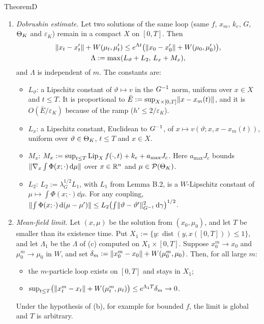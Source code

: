 \begin{thm}{Theorem}{D}
\begin{enumerate}[label=\textup{(\alph*)}]
\item \emph{Dobrushin estimate.} Let two solutions of the same loop (same $f$, $x_m$, $k_e$, $G$, $\Theta_K$ and
  $\varepsilon_K$) remain in a compact $X$ on $[0,T]$. Then
  \begin{equation}\label{eq:thmD:dobrushin}
  \begin{gathered}
    \lVert x_t-x'_t\rVert+W(\mu_t,\mu'_t)\le e^{\Lambda t}\bigl(\lVert x_0-x'_0\rVert+W(\mu_0,\mu'_0)\bigr),\\
    \Lambda := \max(L_\vartheta+L_2,\,L_x+M_x),
  \end{gathered}
  \end{equation}
  and $\Lambda$ is independent of $m$. The constants are:
  \begin{itemize}
  \item $L_\vartheta$: a Lipschitz constant of $\vartheta\mapsto v$ in the $G^{-1}$ norm, uniform over $x\in X$ and
    $t\le T$. It is proportional to $\bar E:=\sup_{X\times[0,T]}\lVert x-x_m(t)\rVert$, and it is $O(\bar E/\varepsilon_K)$
    because of the ramp ($h'\le2/\varepsilon_K$).
  \item $L_x$: a Lipschitz constant, Euclidean to $G^{-1}$, of $x\mapsto v(\vartheta;x,x-x_m(t))$, uniform over
    $\vartheta\in\Theta_K$, $t\le T$ and $x\in X$.
  \item $M_x$: $M_x:=\sup_{t\le T}\operatorname{Lip}_X f(\cdot,t)+k_e+a_{\max}J_c$. Here $a_{\max}J_c$ bounds
    $\lVert \nabla_x\int\Phi(x;\cdot)\,\mathrm{d}\mu\rVert$ over $x\in\mathbb{R}^n$ and $\mu\in\mathcal{P}(\Theta_K)$.
  \item $L_2$: $L_2:=\lambda_G^{1/2}L_1$, with $L_1$ from Lemma B.2, is a $W$-Lipschitz constant of
    $\mu\mapsto\int\Phi(x;\cdot)\dd\mu$. For any coupling,
    $\lVert \int\Phi(x;\cdot)\,\mathrm{d}(\mu-\mu')\rVert\le L_2\bigl(\int\lVert \vartheta-\vartheta'\rVert^2_{G^{-1}}\,\mathrm{d}\gamma\bigr)^{1/2}$.
  \end{itemize}

\item \emph{Mean-field limit.} Let $(x,\mu)$ be the solution from $(x_0,\mu_0)$, and let $T$ be smaller than its
  existence time. Put $X_1:=\{y:\operatorname{dist}(y,x([0,T]))\le1\}$, and let $\Lambda_1$ be the $\Lambda$ of (c)
  computed on $X_1\times[0,T]$. Suppose $x^m_0\to x_0$ and $\mu^m_0\to\mu_0$ in $W$, and set
  $\delta_m:=\lVert x^m_0-x_0\rVert+W(\mu^m_0,\mu_0)$. Then, for all large $m$:
  \begin{itemize}
  \item the $m$-particle loop exists on $[0,T]$ and stays in $X_1$;
  \item $\sup_{t\le T}\bigl(\lVert x^m_t-x_t\rVert+W(\mu^m_t,\mu_t)\bigr)\le e^{\Lambda_1T}\delta_m\to0$.
  \end{itemize}
  Under the hypothesis of (b), for example for bounded $f$, the limit is global and $T$ is arbitrary.


\end{enumerate}
\end{thm}
